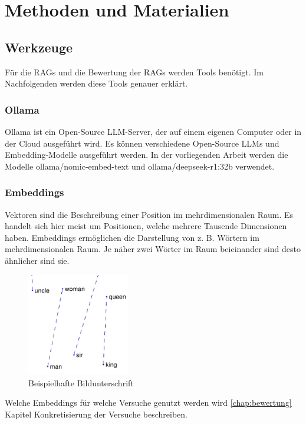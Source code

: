 \chapter{Methoden und Materialien}

\section{Werkzeuge}

Für die RAGs und die Bewertung der RAGs werden Tools benötigt. Im Nachfolgenden werden diese Tools genauer erklärt.

\subsection{Ollama \cite{ollama_2025}}
Ollama ist ein Open-Source LLM-Server, der auf einem eigenen Computer oder in der Cloud ausgeführt wird.
Es können verschiedene Open-Source LLMs und Embedding-Modelle ausgeführt werden. In der vorliegenden Arbeit werden die Modelle ollama/nomic-embed-text und ollama/deepseek-r1:32b verwendet. 

\subsection{Embeddings}
Vektoren sind die Beschreibung einer Position im mehrdimensionalen Raum. Es handelt sich hier meist um Positionen, welche mehrere Tausende Dimensionen haben.
Embeddings ermöglichen die Darstellung von z. B. Wörtern im mehrdimensionalen Raum. Je näher zwei Wörter im Raum beieinander sind desto ähnlicher sind sie.

\begin{figure}[h!]
    \centering
    \includegraphics[width=0.4\textwidth]{images/man_woman_small_embedding.jpg}
    \caption{Beispielhafte Bildunterschrift}
    \label{fig:beispiel}
\end{figure}

Welche Embeddings für welche Versuche genutzt werden wird \ref{chap:bewertung} Kapitel Konkretisierung der Versuche beschreiben.


